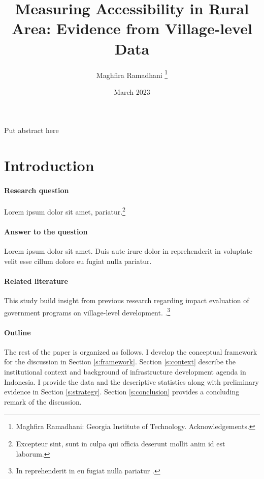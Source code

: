 \documentclass[letterpaper,12pt,leqno]{article}
\begin{document}
\title{Measuring Accessibility in Rural Area: Evidence from Village-level Data}
\author{Maghfira Ramadhani
\thanks{Maghfira Ramadhani: Georgia Institute of Technology. Acknowledgements.}}
\date{March 2023}                       
\begin{titlepage}\maketitle

Put abstract here

\end{titlepage}\section{Introduction}\label{s:introduction}
 
\paragraph{Research question} Lorem ipsum dolor sit amet,  pariatur.\footnote{Excepteur sint, sunt in culpa qui officia deserunt mollit anim id est laborum.}

\paragraph{Answer to the question} Lorem ipsum dolor sit amet. Duis aute irure dolor in reprehenderit in voluptate velit esse cillum dolore eu fugiat nulla pariatur. 

\paragraph{Related literature} This study build insight from previous research regarding impact evaluation of government programs on village-level development. \citet{asher_2020} .\footnote{In reprehenderit in eu fugiat nulla pariatur \citep{LMS18a}.}


\paragraph{Outline}The rest of the paper is organized as follows. I develop the conceptual framework for the discussion in Section \ref{s:framework}. Section \ref{s:context} describe the institutional context and background of infrastructure development agenda in Indonesia. I provide the data and the descriptive statistics along with preliminary evidence in Section \ref{s:strategy}. Section \ref{s:conclusion} provides a concluding remark of the discussion.
\end{document}
